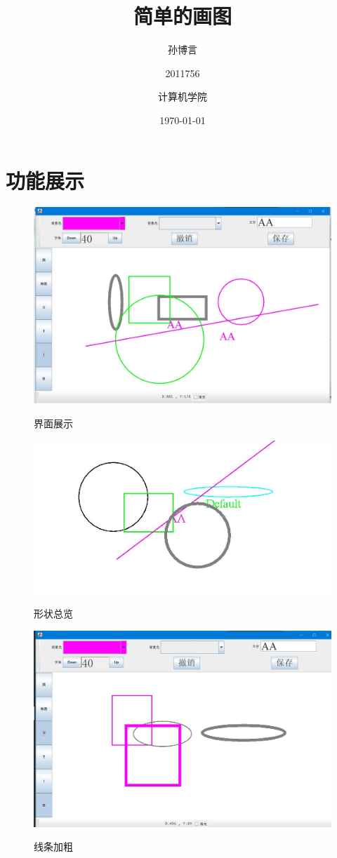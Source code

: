 \documentclass{ctexart}
\title{\heiti \zihao{2} 简单的画图}
\date{\today}
\author{孙博言 \and 2011756 \and 计算机学院}
\begin{document}
\maketitle
\section{功能展示}
\begin{figure}[htbp]
    \centering
    \caption{界面展示}
    \includegraphics[scale = 0.4]{2.jpg}
    \label{fig:1}
\end{figure}
\begin{figure}[htbp]
    \centering
    \caption{形状总览}
    \includegraphics[scale = 0.4]{1.jpg}
    \label{fig:2}
\end{figure}
\begin{figure}[htbp]
    \centering
    \caption{线条加粗}
    \includegraphics[scale = 0.4]{3.jpg}
    \label{fig:3}
\end{figure}
\end{document}
